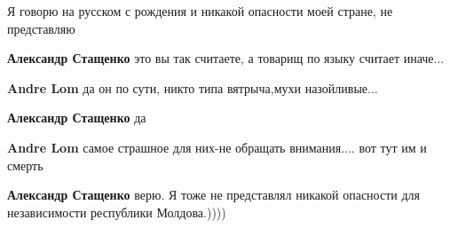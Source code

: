 \begin{itemize}
 
Я говорю на русском с рождения и никакой опасности моей стране, не представляю

\begin{itemize}
 
\textbf{Александр Стащенко} это вы так считаете, а товарищ по языку считает иначе...

 
\textbf{Andre Lom} да он по сути, никто типа вятрыча,мухи назойливые...

 
\textbf{Александр Стащенко} да

 
\textbf{Andre Lom} самое страшное для них-не обращать внимания.... вот тут им и смерть

 
\textbf{Александр Стащенко} верю. Я тоже не представлял никакой опасности для независимости республики Молдова.))))

 

\end{itemize}
\end{itemize}
